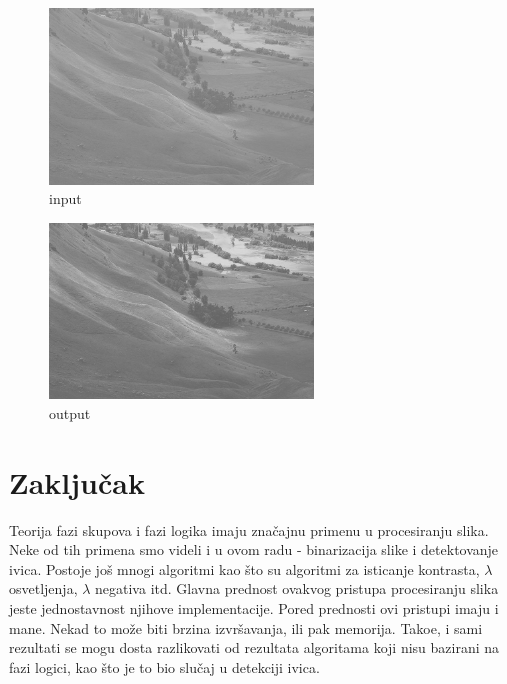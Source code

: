 \documentclass[12pt,a4paper]{article}
\theoremstyle{definition}
\theoremstyle{remark}
\theoremstyle{plain}
\begin{document}
\begin{multicols}{2}
\begin{figure}[H]
\centering
\includegraphics[width=7cm]{images/field.jpg}
  \caption{input}\label{tree_fuzzy_grayscale_input}
\end{figure}
\columnbreak
\begin{figure}[H]
\centering
\includegraphics[width=7cm]{images/fuzzy_grayscale_2.jpg}
  \caption{output}\label{fuzzy_grayscale_output2}
\end{figure}
\end{multicols}












\section{Zaklju\v cak}
Teorija fazi skupova i fazi logika imaju zna\v cajnu primenu u procesiranju slika. Neke od tih primena smo videli i u ovom radu - binarizacija slike i detektovanje ivica. Postoje jo\v s mnogi algoritmi kao \v sto su algoritmi za isticanje kontrasta, $\lambda$ osvetljenja, $\lambda$ negativa itd.  Glavna prednost ovakvog pristupa procesiranju slika jeste jednostavnost njihove implementacije. Pored prednosti ovi pristupi imaju i mane. Nekad to mo\v ze biti brzina izvr\v savanja, ili pak memorija. Tako\dj e, i sami rezultati se mogu dosta razlikovati od rezultata algoritama koji nisu bazirani na fazi logici, kao \v sto je to bio slu\v caj u detekciji ivica.
\end{document}

